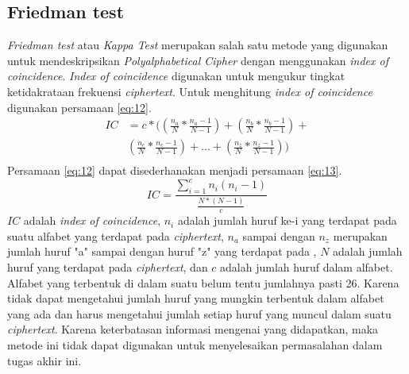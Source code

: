 	\subsection{Friedman test}
	\textit{Friedman test} atau \textit{Kappa Test} merupakan salah satu metode yang digunakan untuk mendeskripsikan \textit{Polyalphabetical Cipher} dengan menggunakan \textit{index of coincidence}. \textit{Index of coincidence} digunakan untuk mengukur tingkat ketidakrataan frekuensi \textit{ciphertext}. Untuk menghitung \textit{index of coincidence} digunakan persamaan \ref{eq:12}\cite{henk_encyclopedia_2005}.
	\begin{equation} \label{eq:12}
	\begin{split}
	IC&=c*((\frac{n_a}{N}*\frac{n_a-1}{N-1})+(\frac{n_b}{N}*\frac{n_b-1}{N-1})+ \\
	&(\frac{n_c}{N}*\frac{n_c-1}{N-1})+...+(\frac{n_z}{N}*\frac{n_z-1}{N-1}))\\
	\end{split}
	\end{equation}
	Persamaan \ref{eq:12} dapat disederhanakan menjadi persamaan \ref{eq:13}.
	\begin{equation} \label{eq:13}
	IC=\frac{\sum_{i=1}^{c}n_i(n_i-1)}{\frac{N*(N-1)}{c}}
	\end{equation}
	$IC$ adalah \textit{index of coincidence}, $n_i$ adalah jumlah huruf ke-i yang terdapat pada suatu alfabet yang terdapat pada \textit{ciphertext}, $n_a$ sampai dengan $n_z$ merupakan jumlah huruf "a" sampai dengan huruf "z" yang terdapat pada \ciphertext, $N$ adalah jumlah huruf yang terdapat pada \textit{ciphertext}, dan $c$ adalah jumlah huruf dalam alfabet. Alfabet yang terbentuk di dalam suatu \ciphertext belum tentu jumlahnya pasti 26. Karena tidak dapat mengetahui jumlah huruf yang mungkin terbentuk dalam alfabet yang ada dan harus mengetahui jumlah setiap huruf yang muncul dalam suatu \textit{ciphertext}. Karena keterbatasan informasi mengenai \ciphertext yang didapatkan, maka metode ini tidak dapat digunakan untuk menyelesaikan permasalahan dalam tugas akhir ini.
	
